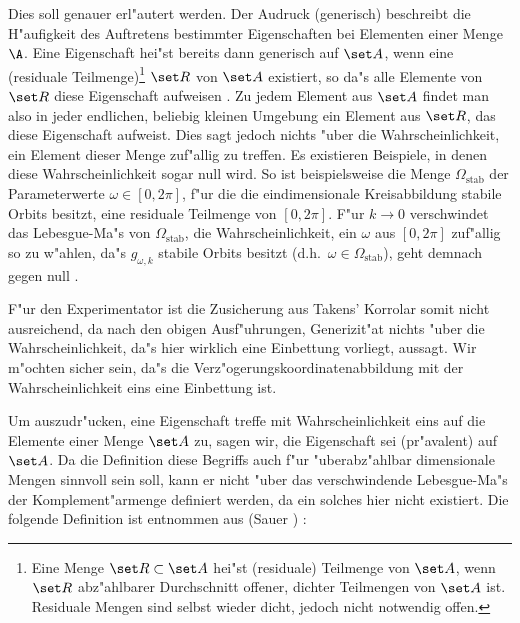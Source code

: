 Dies soll genauer erl"autert werden.  Der Audruck \naja(generisch) beschreibt die H"aufigkeit
des Auftretens bestimmter Eigenschaften bei Elementen einer Menge $\A$.
Eine \label{generisch} Eigenschaft hei"st bereits dann generisch auf $\set A$, wenn
eine \begriff(residuale Teilmenge)\footnote{Eine Menge $\set R\subset\set A$ hei"st
\begriff(residuale) Teilmenge von $\set A$, wenn $\set R$ abz"ahlbarer Durchschnitt
offener, dichter Teilmengen von $\set A$ ist. Residuale Mengen sind selbst wieder dicht, jedoch nicht notwendig offen. }
 $\set R$ von $\set A$ existiert, so
da"s alle Elemente von $\set R$ diese Eigenschaft aufweisen \cite{Liebert91}.
Zu jedem Element aus $\set A$ findet man also in
jeder endlichen, beliebig kleinen Umgebung ein Element aus $\set R$, das diese
Eigenschaft aufweist. Dies sagt jedoch nichts "uber die
Wahrscheinlichkeit, ein Element dieser Menge zuf"allig zu treffen. Es existieren Beispiele,
in denen diese Wahrscheinlichkeit sogar null wird. So ist beispielsweise
die Menge $\Omega_{\text{stab}}$ der Parameterwerte $\omega\in[0,2\pi]$, f"ur die die
eindimensionale Kreisabbildung
stabile Orbits besitzt, eine residuale Teilmenge von $[0,2\pi]$. F"ur $k\to0$ verschwindet
das Lebesgue-Ma"s von $\Omega_{\text{stab}}$, die Wahrscheinlichkeit, ein
$\omega$ aus $[0,2\pi]$ zuf"allig so zu w"ahlen, da"s $g_{\omega,k}$ stabile Orbits besitzt (d.h.\
$\omega\in\Omega_{\text{stab}}$), geht demnach gegen null \cite{Sauer91}.


F"ur den Experimentator ist die Zusicherung aus Takens' Korrolar somit nicht ausreichend,
da nach den obigen Ausf"uh\-rungen, Generizit"at nichts "uber die Wahrscheinlichkeit, da"s
hier wirklich eine Einbettung vorliegt, aussagt. Wir m"ochten sicher sein, da"s die
Verz"ogerungskoordinatenabbildung mit der Wahrscheinlichkeit eins eine Einbettung ist.

Um auszudr"ucken, eine Eigenschaft treffe mit Wahrscheinlichkeit eins auf die Elemente
einer Menge $\set A$ zu, sagen wir, die Eigenschaft sei \begriff(pr"avalent) auf $\set A$. 
Da die Definition diese Begriffs auch f"ur "uberabz"ahlbar dimensionale Mengen sinnvoll
sein soll, kann er nicht "uber das verschwindende Lebesgue-Ma"s der Komplement"armenge
definiert werden, da ein solches hier nicht existiert. Die folgende Definition ist
entnommen aus \autor(Sauer \etal) \cite{Sauer91}:

